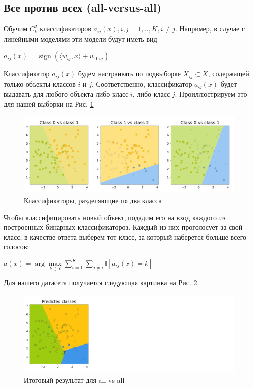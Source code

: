 \begin{itemize}
\subsection{Все против всех (all-versus-all)}

Обучим  $C^2_k$ классификаторов $a_{ij}(x), i, j = 1,..,K, i \neq j$. Например, в случае с линейными моделями эти модели будут иметь вид

$a_{ij}(x) = \operatorname{sign}(\langle w_{ij}, x \rangle+w_{0,ij})$

Классификатор $a_{ij}(x)$ будем настраивать по подвыборке $X_{ij} \subset X$, содержащей только объекты классов $i$ и $j$. Соответственно, классификатор $a_{ij}(x)$ будет выдавать для любого объекта либо класс $i$, либо класс $j$. Проиллюстрируем это для нашей выборки на Рис. \ref{fig:linear-multi-ava-models}

\begin{figure}[H]
	\centering
	\includegraphics[width=0.8\linewidth]{chapters/linear/pics/multi-ava-models.png}
	\caption{Классификаторы, разделяющие по два класса}
	\label{fig:linear-multi-ava-models}
\end{figure}

Чтобы классифицировать новый объект, подадим его на вход каждого из построенных бинарных классификаторов. Каждый из них проголосует за свой класс; в качестве ответа выберем тот класс, за который наберется больше всего голосов:

$a(x) = \operatorname{arg}\max\limits_{k \in Y} \sum\limits_{i=1}^K\sum\limits_{j\neq i} \mathbb{I}[a_{ij}(x) = k]$

Для нашего датасета получается следующая картинка на Рис. \ref{fig:linear-multi-ava-final}

\begin{figure}[H]
	\centering
	\includegraphics[width=0.8\linewidth]{chapters/linear/pics/multi-ava-final.png}
	\caption{Итоговый результат для all-vs-all}
	\label{fig:linear-multi-ava-final}
\end{figure}


\end{itemize}
